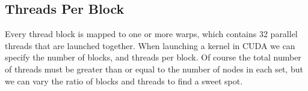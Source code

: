 \subsection*{Threads Per Block}
Every thread block is mapped to one or more warps, which contains 32 parallel threads that are launched together. When launching a kernel in CUDA we can specify the number of blocks, and threads per block. Of course the total number of threads must be greater than or equal to the number of nodes in each set, but we can vary the ratio of blocks and threads to find a sweet spot.

